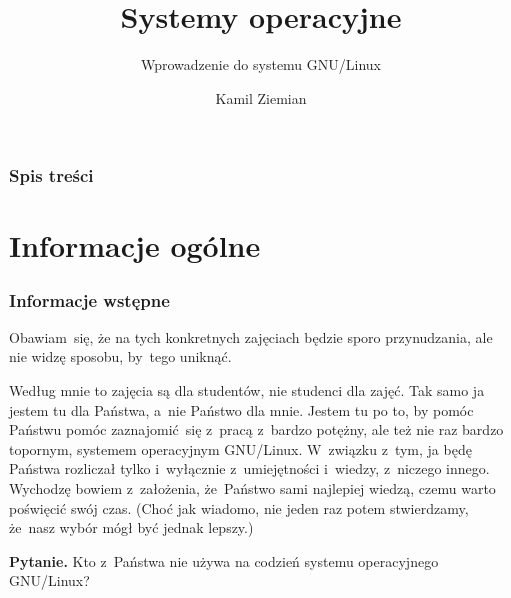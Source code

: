 \documentclass[10pt,t]{beamer}
\title{Systemy operacyjne}
\subtitle{Wprowadzenie do systemu GNU/Linux}
\author{Kamil Ziemian}
\begin{document}





\RaggedRight





\maketitle





\begin{frame}
  \frametitle{Spis treści}


  \tableofcontents

\end{frame}





\section{Informacje ogólne}



\begin{frame}
  \frametitle{Informacje wstępne}


  Obawiam~się, że na tych konkretnych zajęciach będzie sporo przynudzania,
  ale nie widzę sposobu, by~tego uniknąć.

  Według mnie to zajęcia są dla studentów, nie studenci dla zajęć. Tak samo
  ja jestem tu dla Państwa, a~nie Państwo dla mnie. Jestem tu po to, by
  pomóc Państwu pomóc zaznajomić~się z~pracą z~bardzo potężny, ale też
  nie raz bardzo topornym, systemem operacyjnym GNU/Linux. W~związku z~tym,
  ja będę Państwa rozliczał tylko i~wyłącznie z~umiejętności i~wiedzy,
  z~niczego innego. Wychodzę bowiem z~założenia, że~Państwo sami najlepiej
  wiedzą, czemu warto poświęcić swój czas. (Choć jak wiadomo, nie jeden raz
  potem stwierdzamy, że~nasz wybór mógł być jednak lepszy.)

  \textbf{Pytanie.} Kto z~Państwa \alert{nie} używa na codzień systemu
  operacyjnego GNU/Linux?

\end{frame}
\end{document}
